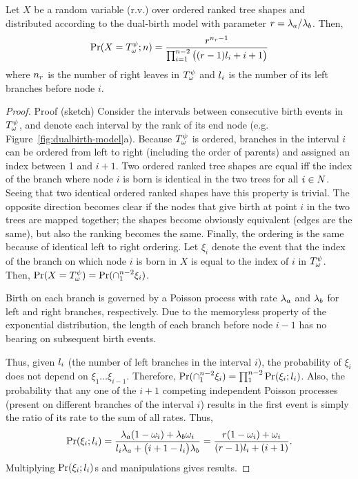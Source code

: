 \begin{theorem}\label{sup:thm:TRO}
Let $X$ be a random variable (r.v.) over ordered ranked tree shapes and distributed according to the dual-birth model with parameter $r=\lambda_a/\lambda_b$. Then, 
\begin{equation}
\Pr(X=T^\psi_{\omega};n) = \frac{r^{n_r-1}}{\prod_{i=1}^{n-2} \big((r-1)l_{i}+i+1\big)}
\end{equation}
where $n_r$ is the number of right leaves in $T^\psi_{\omega}$ and $l_{i}$ is the number of its left branches before node $i$.
\end{theorem}
\begin{proof}{Proof (sketch)}
Consider the intervals between consecutive birth events in $T^\psi_{\omega}$, and denote each interval by the rank of its end node (e.g. Figure~\ref{fig:dualbirth-model}a). Because $T^\psi_{\omega}$ is ordered, branches in the interval $i$ can be ordered from left to right (including the order of parents) and assigned an index between 1 and $i+1$. Two ordered ranked tree shapes are equal iff the index of the branch where node $i$ is born is identical in the two trees for all $i\in N$. Seeing that two identical ordered ranked shapes have this property is trivial. The opposite direction becomes clear if the nodes that give birth at point $i$ in the two trees are mapped together; the shapes become obviously equivalent (edges are the same), but also the ranking becomes the same. Finally, the ordering is the same because of identical left to right ordering. Let $\xi_i$ denote the event that the index of the branch on which node $i$ is born in $X$ is equal to the index of $i$ in $T^\psi_{\omega}$. Then, $\Pr(X=T^\psi_{\omega})=\Pr(\cap_1^{n-2} \xi_i)$.

Birth on each branch is governed by a Poisson process with rate $\lambda_a$ and $\lambda_b$ for left and right branches, respectively. Due to the memoryless property of the exponential distribution, the length of each branch before node $i-1$ has no bearing on subsequent birth events.

Thus, given $l_{i}$ (the number of left branches in the interval $i$), the probability of $\xi_i$ does not depend on $\xi_1\ldots \xi_{i-1}$. Therefore, $\Pr(\cap_1^{n-2} \xi_i)=\prod_1^{n-2} \Pr(\xi_i;l_{i})$. Also, the probability that any one of the $i+1$ competing independent Poisson processes (present on different branches of the interval $i$) results in the first event is simply the ratio of its rate to the sum of all rates. Thus,
$$\Pr(\xi_i;l_{i})=\frac{\lambda_a(1-\omega_i)+\lambda_b\omega_i}{l_{i}\lambda_a+\big(i+1-l_{i}\big)\lambda_b}
=\frac{r(1-\omega_i)+\omega_i}{(r-1)l_{i}+(i+1)}.$$
Multiplying $\Pr(\xi_i;l_{i})$s and manipulations gives results.
\end{proof}

